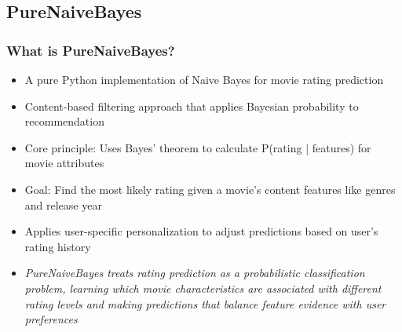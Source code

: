 \documentclass{beamer}
\begin{document}
\subsection{PureNaiveBayes}
\begin{frame}
\frametitle{What is PureNaiveBayes?}

\begin{itemize}
    \item A pure Python implementation of Naive Bayes for movie rating prediction
    \item Content-based filtering approach that applies Bayesian probability to recommendation
    \item Core principle: Uses Bayes' theorem to calculate P(rating | features) for movie attributes
    \item Goal: Find the most likely rating given a movie's content features like genres and release year
    \item Applies user-specific personalization to adjust predictions based on user's rating history
    
    \vspace{1cm}

    \item \textit{PureNaiveBayes treats rating prediction as a probabilistic classification problem, learning which movie characteristics are associated with different rating levels and making predictions that balance feature evidence with user preferences}
\end{itemize}
\end{frame}
\end{document}
